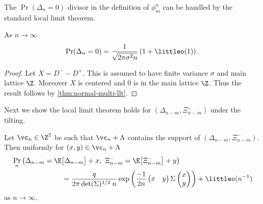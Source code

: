The $\Pr(\Delta_n = 0)$ divisor in the definition of $\phi_m^n$ can be handled by the standard local limit theorem.
\begin{lemma}
    \label{lem:normal-llt}
    As $n \to \infty$
    \begin{equation*}
        \Pr(\Delta_n = 0) = \frac{1}{\sqrt{2 \pi \sigma^2 n}} \left( 1 + \littleo(1) \right).
    \end{equation*}
\end{lemma}
\begin{proof}
    Let $X = D^- - D^+$. This is assumed to have finite variance $\sigma$ and main lattice $\Z$. Moreover $X$ is centered and $0$ is in the main lattice $\Z$. Thus the result follows by \cref{thm:normal-multi-llt}.
\end{proof}

Next we show the local limit theorem holds for $(\Delta_{n-m}, \Xi^-_{n-m})$ under the tilting.
\begin{lemma}
    \label{lem:bivar-llt}
    Let $\vc_n \in \Z^2$ be such that $\vc_n + \Lambda$ contains the support of $(\Delta_{n-m}, \Xi^-_{n-m})$. Then uniformly for $(x, y) \in \vc_n + \Lambda$
    \begin{align*}
        &\Pr_n\left(
            \Delta_{n-m} = \E \big[ \Delta_{n-m} \big] + x, \ 
            \Xi^-_{n-m} = \E \big[ \Xi^-_{n-m} \big] + y
        \right)  \nonumber \\
        &\hspace{7em} = \frac{q}{2\pi \det(\Sigma)^{1/2} \: n} \exp\left( 
            \frac{-1}{2n}
            \begin{pmatrix}
                x & y
            \end{pmatrix}
            \Sigma
            \begin{pmatrix}
                x \\ y
            \end{pmatrix}
         \right)
         + \littleo( n^{-1} )
    \end{align*}
    as $n \to \infty$.
\end{lemma}
